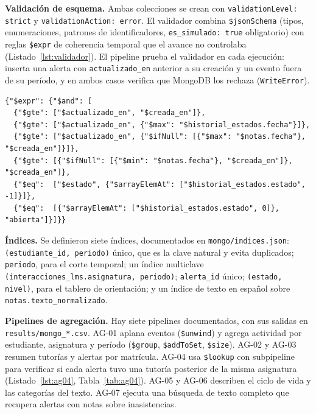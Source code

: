 \documentclass[11pt,a4paper]{article}
\begin{document}
\textbf{Validación de esquema.} Ambas colecciones se crean con \texttt{validationLevel: strict} y
\texttt{validationAction: error}. El validador combina \texttt{\$jsonSchema} (tipos, enumeraciones,
patrones de identificadores, \texttt{es\_simulado: true} obligatorio) con reglas \texttt{\$expr} de
coherencia temporal que el avance no controlaba (Listado~\ref{lst:validador}). El pipeline prueba el
validador en cada ejecución: inserta una alerta con \texttt{actualizado\_en} anterior a su creación y
un evento fuera de su período, y en ambos casos verifica que MongoDB los rechaza
(\texttt{WriteError}).

\begin{lstlisting}[caption={Reglas \texttt{\$expr} del validador de \texttt{alertas\_riesgo} (extracto de \texttt{mongo/validadores.json}).}, label=lst:validador]
{"$expr": {"$and": [
  {"$gte": ["$actualizado_en", "$creada_en"]},
  {"$gte": ["$actualizado_en", {"$max": "$historial_estados.fecha"}]},
  {"$gte": ["$actualizado_en", {"$ifNull": [{"$max": "$notas.fecha"}, "$creada_en"]}]},
  {"$gte": [{"$ifNull": [{"$min": "$notas.fecha"}, "$creada_en"]}, "$creada_en"]},
  {"$eq":  ["$estado", {"$arrayElemAt": ["$historial_estados.estado", -1]}]},
  {"$eq":  [{"$arrayElemAt": ["$historial_estados.estado", 0]}, "abierta"]}]}}
\end{lstlisting}

\textbf{Índices.} Se definieron siete índices, documentados en \texttt{mongo/indices.json}:
\texttt{(estudiante\_id, periodo)} único, que es la clave natural y evita duplicados;
\texttt{periodo}, para el corte temporal; un índice multiclave
\texttt{(interacciones\_lms.asignatura, periodo)}; \texttt{alerta\_id} único;
\texttt{(estado, nivel)}, para el tablero de orientación; y un índice de texto en español sobre
\texttt{notas.texto\_normalizado}.

\textbf{Pipelines de agregación.} Hay siete pipelines documentados, con sus salidas en
\texttt{results/mongo\_*.csv}. AG-01 aplana eventos (\texttt{\$unwind}) y agrega actividad por
estudiante, asignatura y período (\texttt{\$group}, \texttt{\$addToSet}, \texttt{\$size}). AG-02 y
AG-03 resumen tutorías y alertas por matrícula. AG-04 usa \texttt{\$lookup} con subpipeline para
verificar si cada alerta tuvo una tutoría posterior de la misma asignatura (Listado~\ref{lst:ag04}, Tabla~\ref{tab:ag04}). AG-05 y AG-06 describen el ciclo de vida y las categorías del texto. AG-07
ejecuta una búsqueda de texto completo que recupera \nBusquedaTexto{} alertas con notas sobre
inasistencias.
\end{document}
